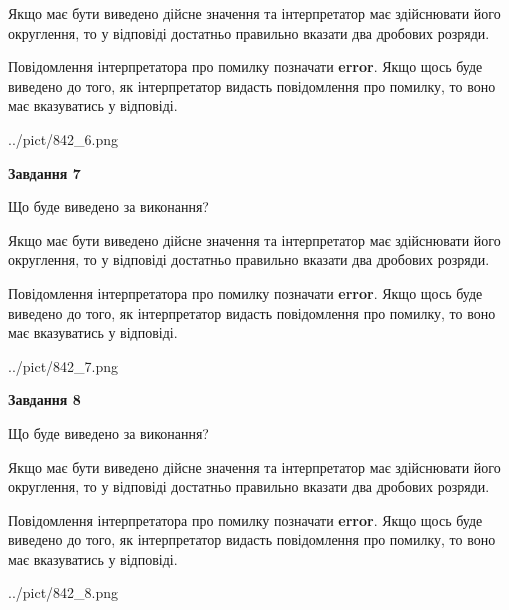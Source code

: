 \documentclass[12pt, ukrainian]{article}
\begin{document}
{\begin {Large}
Якщо має бути виведено дійсне значення та інтерпретатор має здійснювати його округлення, 
то у відповіді достатньо правильно вказати два дробових розряди.

Повідомлення інтерпретатора про помилку позначати \textbf{error}.
Якщо щось буде виведено до того, як інтерпретатор видасть повідомлення про помилку, 
то воно має вказуватись у відповіді. \par

\begin{center}
	{../pict/842_6.png}
\end{center}
\newpage

{\begin {center}\textbf{Завдання 7}\end {center}}\par
Що буде виведено за виконання? \par

Якщо має бути виведено дійсне значення та інтерпретатор має здійснювати його округлення, 
то у відповіді достатньо правильно вказати два дробових розряди.

Повідомлення інтерпретатора про помилку позначати \textbf{error}.
Якщо щось буде виведено до того, як інтерпретатор видасть повідомлення про помилку, 
то воно має вказуватись у відповіді. \par

\begin{center}
	{../pict/842_7.png}
\end{center}
\newpage

{\begin {center}\textbf{Завдання 8}\end {center}}\par
Що буде виведено за виконання? \par

Якщо має бути виведено дійсне значення та інтерпретатор має здійснювати його округлення, 
то у відповіді достатньо правильно вказати два дробових розряди.

Повідомлення інтерпретатора про помилку позначати \textbf{error}.
Якщо щось буде виведено до того, як інтерпретатор видасть повідомлення про помилку, 
то воно має вказуватись у відповіді. \par

\begin{center}
	{../pict/842_8.png}
\end{center}
\newpage


\end{Large}}
\end{document}
